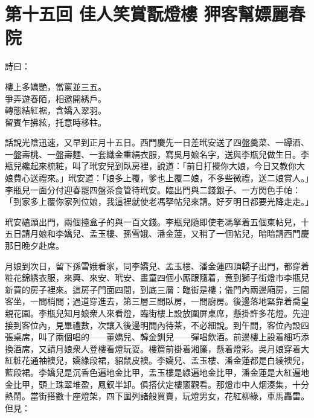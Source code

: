 
\chapter*{第十五回 佳人笑賞翫燈樓 狎客幫嫖麗春院}


詩曰：

\begin{myquote}
樓上多嬌艷，當窻並三五。\\爭弄遊春陌，相邀開綉戶。\\轉態結紅裾，含嬌入翠羽。\\留賓乍拂絃，托意時移柱。
\end{myquote}

話說光陰迅速，又早到正月十五日。西門慶先一日差玳安送了四盤羹菜、一罈酒、一盤壽桃、一盤壽麵、一套織金重絹衣服，寫吳月娘名字，送與李瓶兒做生日。李瓶兒纔起來梳粧，叫了玳安兒到臥房裡，說道：「前日打攪你大娘，今日又教你大娘費心送禮來。」玳安道：「娘多上覆，爹也上覆二娘，{}不多些微禮，送二娘賞人。」李瓶兒一面分付迎春罷四盤茶食管待玳安。臨出門與二錢銀子、一方閃色手帕：「到家多上覆你家列位娘，我這裡就使老馮拏帖兒來請。好歹明日都要光降走走。」

玳安磕頭出門，兩個擡盒子的與一百文錢。李瓶兒隨即使老馮拏着五個柬帖兒，十五日請月娘和李嬌兒、孟玉樓、孫雪娥、潘金蓮，又稍了一個帖兒，暗暗請西門慶那日晚夕赴席。

月娘到次日，留下孫雪娥看家，同李嬌兒、孟玉樓、潘金蓮四頂轎子出門，都穿着粧花錦綉衣服，來興、來安、玳安、畫童四個小厮跟隨着，竟到獅子街燈市李瓶兒新買的房子裡來。這房子門面四間，到底三層：臨街是樓；儀門內兩邊廂房，三間客坐，一間梢間；過道穿進去，第三層三間臥房，一間廚房。後邊落地緊靠着喬皇親花園。{}李瓶兒知月娘衆人來看燈，臨街樓上設放圍屏桌席，懸掛許多花燈。先迎接到客位內，見畢禮數，次讓入後邊明間內待茶，不必細說。到午間，客位內設四張桌席，叫了兩個唱的——董嬌兒、韓金釧兒——彈唱飲酒。前邊樓上設着細巧添換酒席，又請月娘衆人登樓看燈玩耍。樓簷前掛着湘簾，懸着燈彩。吳月娘穿着大紅粧花通袖襖兒，嬌綠段裙，貂鼠皮襖。李嬌兒、孟玉樓、潘金蓮都是白綾襖兒，藍段裙。李嬌兒是沉香色遍地金比甲，孟玉樓是綠遍地金比甲，潘金蓮是大紅遍地金比甲，頭上珠翠堆盈，鳳釵半卸。俱搭伏定樓窻觀看。那燈市中人烟湊集，十分熱鬧。當街搭數十座燈架，四下圍列諸般買賣，玩燈男女，花紅柳綠，車馬轟雷。但見：

